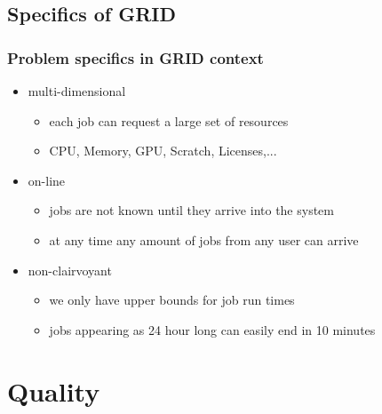 \subsection{Specifics of GRID}

\begin{frame}
	\frametitle{Problem specifics in GRID context}
	\begin{itemize}
		\item multi-dimensional
		\begin{itemize}
			\item each job can request a large set of resources
			\item CPU, Memory, GPU, Scratch, Licenses,...
		\end{itemize}
		\item on-line
		\begin{itemize}
			\item jobs are not known until they arrive into the system
			\item at any time any amount of jobs from any user can arrive
		\end{itemize}
		\item non-clairvoyant
		\begin{itemize}
			\item we only have upper bounds for job run times
			\item jobs appearing as 24 hour long can easily end in 10 minutes
		\end{itemize}
	\end{itemize}
\end{frame}




\section{Quality}
